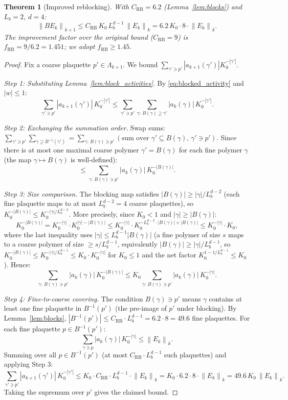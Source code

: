 \documentclass[11pt,a4paper]{amsart}
\newtheorem{theorem}{Theorem}[section]
\theoremstyle{definition}
\newcommand{\norm}[1]{\left\|#1\right\|}
\newcommand{\CRB}{C_{\mathrm{RB}}}
\begin{document}
\begin{theorem}[Improved reblocking]
\label{thm:reblock}
With $\CRB = 6.2$ (Lemma~\ref{lem:blocks}) and $L_b = 2$, $d = 4$:
\[
  \norm{BE_k}_{k+1} \le \CRB\,K_0\,L_b^{d-1}\,\norm{E_k}_k
  = 6.2\,K_0\cdot 8\cdot\norm{E_k}_k.
\]
The improvement factor over the original bound ($\CRB = 9$) is
$f_{\mathrm{RB}} = 9/6.2 = 1.451$; we adopt $f_{\mathrm{RB}} \ge 1.45$.
\end{theorem}
\begin{proof}
Fix a coarse plaquette $p' \in \Lambda_{k+1}$.  We bound
$\sum_{\gamma'\ni p'} |a_{k+1}(\gamma')| K_0^{-|\gamma'|}$.

\textit{Step 1: Substituting Lemma~\ref{lem:block_activities}.}
By \eqref{eq:blocked_activity} and $|w|\le 1$:
\[
  \sum_{\gamma'\ni p'}|a_{k+1}(\gamma')|\,K_0^{-|\gamma'|}
  \le \sum_{\gamma'\ni p'}\sum_{\gamma:\,B(\gamma)\supseteq\gamma'} |a_k(\gamma)|\,K_0^{-|\gamma'|}.
\]

\textit{Step 2: Exchanging the summation order.}
Swap sums: $\sum_{\gamma'\ni p'}\sum_{\gamma\supseteq B^{-1}(\gamma')}
= \sum_{\gamma:\,B(\gamma)\ni p'} (\text{sum over } \gamma'\subseteq B(\gamma),\,\gamma'\ni p')$.
Since there is at most one maximal coarse polymer $\gamma' = B(\gamma)$ for each
fine polymer $\gamma$ (the map $\gamma\mapsto B(\gamma)$ is well-defined):
\[
  \le \sum_{\gamma:\,B(\gamma)\ni p'} |a_k(\gamma)|\,K_0^{-|B(\gamma)|}.
\]

\textit{Step 3: Size comparison.}
The blocking map satisfies $|B(\gamma)| \ge |\gamma|/L_b^{d-2}$
(each fine plaquette maps to at most $L_b^{d-2} = 4$ coarse plaquettes),
so $K_0^{-|B(\gamma)|} \le K_0^{-|\gamma|/L_b^{d-2}}$.
More precisely, since $K_0 < 1$ and $|\gamma| \ge |B(\gamma)|$:
\[
  K_0^{-|B(\gamma)|} = K_0^{-|\gamma|} \cdot K_0^{|\gamma|-|B(\gamma)|}
  \le K_0^{-|\gamma|} \cdot K_0^{-L_b^{d-2}\cdot|B(\gamma)|+|B(\gamma)|}
  \le K_0^{-|\gamma|} \cdot K_0,
\]
where the last inequality uses $|\gamma| \le L_b^{d-1}|B(\gamma)|$
(a fine polymer of size $s$ maps to a coarse polymer of size $\ge s/L_b^{d-1}$,
equivalently $|B(\gamma)| \ge |\gamma|/L_b^{d-1}$, so
$K_0^{-|B(\gamma)|} \le K_0^{-|\gamma|/L_b^{d-1}} \le K_0 \cdot K_0^{-|\gamma|}$
for $K_0 \le 1$ and the net factor $K_0^{1-1/L_b^{d-1}} \le K_0$).
Hence:
\[
  \sum_{\gamma:\,B(\gamma)\ni p'} |a_k(\gamma)|\,K_0^{-|B(\gamma)|}
  \le K_0 \sum_{\gamma:\,B(\gamma)\ni p'} |a_k(\gamma)|\,K_0^{-|\gamma|}.
\]

\textit{Step 4: Fine-to-coarse covering.}
The condition $B(\gamma)\ni p'$ means $\gamma$ contains at least one fine plaquette
in $B^{-1}(p')$ (the pre-image of $p'$ under blocking).
By Lemma~\ref{lem:blocks}, $|B^{-1}(p')| \le \CRB \cdot L_b^{d-1} = 6.2 \cdot 8 = 49.6$
fine plaquettes.  For each fine plaquette $p \in B^{-1}(p')$:
\[
  \sum_{\gamma\ni p} |a_k(\gamma)|\,K_0^{-|\gamma|} \le \norm{E_k}_k.
\]
Summing over all $p \in B^{-1}(p')$ (at most $\CRB\cdot L_b^{d-1}$ such plaquettes)
and applying Step 3:
\[
  \sum_{\gamma'\ni p'}|a_{k+1}(\gamma')|\,K_0^{-|\gamma'|}
  \le K_0 \cdot \CRB\cdot L_b^{d-1}\cdot\norm{E_k}_k
  = K_0\cdot 6.2\cdot 8\cdot\norm{E_k}_k
  = 49.6\,K_0\,\norm{E_k}_k.
\]
Taking the supremum over $p'$ gives the claimed bound.
\end{proof}
\end{document}
